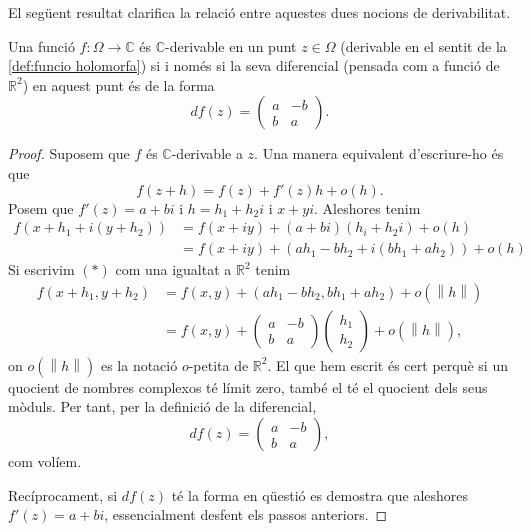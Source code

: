 \documentclass[12pt,twoside]{report}
\numberwithin{table}{section}
\numberwithin{equation}{section}
\numberwithin{figure}{section}
\newcommand{\R}{\ensuremath{\mathbb{R}}}
\newcommand{\C}{\ensuremath{\mathbb{C}}}
\newcommand{\norm}[1]{\left\lVert #1 \right\rVert}
\begin{document}
El següent resultat clarifica la relació entre aquestes dues nocions de derivabilitat.
\begin{prop}
	Una funció \( f \colon \Omega \to \C \) és \( \C \)-derivable en un punt \( z \in \Omega \) (derivable en el sentit de la \cref{def:funcio holomorfa}) si i només si la seva diferencial (pensada com a funció de \( \R^2 \)) en aquest punt és de la forma 
	\begin{equation*}
		df(z) = \begin{pmatrix}
			a & -b \\
			b & a
		\end{pmatrix}.
	\end{equation*}
\end{prop}

\begin{proof}
	Suposem que \( f \) és \( \C \)-derivable a \( z \). Una manera equivalent d'escriure-ho és que
	\begin{equation*}
		f(z + h) = f(z) + f'(z)h + o(h).
	\end{equation*}
	Posem que \( f'(z) = a + bi \) i \( h = h_1 + h_2i \) i \( x + yi \). Aleshores tenim
	\begin{align*}
		f(x + h_1 + i(y + h_2)) & = f(x + iy) + (a + bi)(h_i + h_2i) + o(h) \\
														& = f(x + iy) + (ah_1 - bh_2 + i(bh_1 + ah_2)) + o(h) \tag{\( \ast \)}
	\end{align*}
	Si escrivim \( (\ast) \) com una igualtat a \( \R^2 \) tenim
	\begin{align*}
		f(x + h_1, y + h_2) & = f(x,y) + (ah_1 - bh_2, bh_1 + ah_2) + o(\norm{h}) \\
												& = f(x,y) + \begin{pmatrix} a & -b \\ b & a \end{pmatrix} \begin{pmatrix}								h_1 \\ h_2 \end{pmatrix} + o(\norm{h}),
	\end{align*}
	on \( o(\norm{h}) \) es la notació \( o \)-petita de \( \R^2 \). El que hem escrit és cert perquè si un quocient de nombres complexos té límit zero, també el té el quocient dels seus mòduls. Per tant, per la definició de la diferencial,
	\begin{equation*}
		df(z) = \begin{pmatrix}
			a & -b \\
			b & a
		\end{pmatrix},
	\end{equation*}
	com volíem. 	

	Recíprocament, si \( df(z) \) té la forma en qüestió es demostra que aleshores \( f'(z) = a + bi \), essencialment desfent els passos anteriors.
\end{proof}
\end{document}

